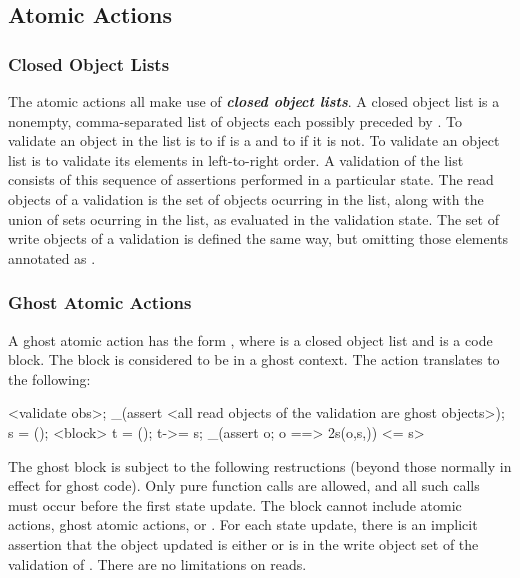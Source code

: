 \documentclass[preprint,nocopyrightspace]{sigplanconf}
\newcommand{\Def}[1]{\textit{\textbf{#1}}}
\begin{document}
{{{{\begin{VCC}
\subsection{Atomic Actions}

\subsubsection{Closed Object Lists}
The atomic actions all make use of \Def{closed object lists}. A closed
object list is a nonempty, comma-separated list of objects
each possibly preceded
by . To validate an object  in the list is to 
 if  is a \vcc{\claim} and to
 if it is not.
To validate an object list is to validate its elements in
left-to-right order. A validation of the list consists of this
sequence of assertions performed in a particular state. The read
objects of a validation is the set of objects ocurring in the list,
along with the union of sets ocurring in the list, as evaluated in the
validation state. The set of write objects of a validation is defined
the same way, but omitting those elements annotated
as .

\subsubsection{Ghost Atomic Actions}
A ghost atomic action has the form ,
where  is a closed object list and  is a code
block. The block is considered to be in a ghost context. 
The action translates to the following:

\begin{VCC}
<validate obs>;
_(assert <all read objects of the validation are ghost objects>);
\state s = \now();
<block>
\state t = \now();
t->\last = s;
_(assert \forall \object o; o 
  ==> \inv2s(o,s,\now))
<\last = s>
\end{VCC}

The ghost block is subject to the following restructions (beyond those
normally in effect for ghost code). Only pure function calls are
allowed, and all such calls must occur before the first state update. The
block cannot include atomic actions, ghost atomic
actions,  or . For each state update,
there is an implicit assertion that the object updated is
either \vcc{\mutable} or is in the write object set of the validation
of . There are no limitations on reads.


\end{VCC}}}}}
\end{document}
